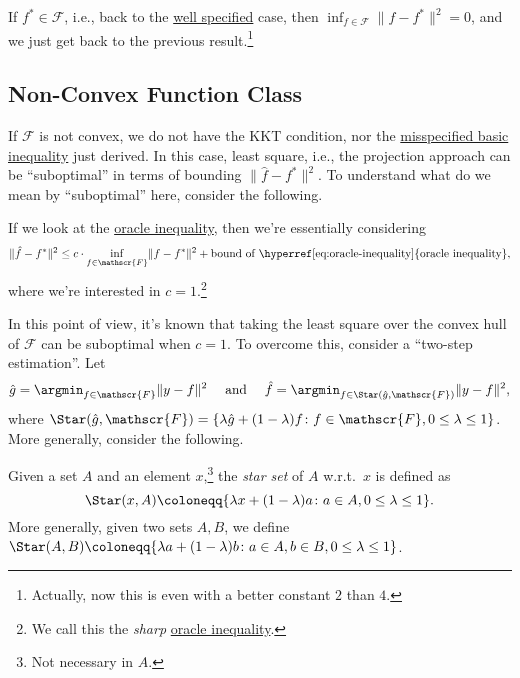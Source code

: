 \begin{remark}
	If \(f^{\ast} \in \mathscr{F} \), i.e., back to the \hyperref[def:well-specified]{well specified} case, then \(\inf _{f\in \mathscr{F} } \lVert f - f^{\ast} \rVert ^2 = 0\), and we just get back to the previous result.\footnote{Actually, now this is even with a better constant \(2\) than \(4\).}
\end{remark}

\subsection{Non-Convex Function Class}
If \(\mathscr{F} \) is not convex, we do not have the KKT condition, nor the \hyperref[eq:misspecified-convex-basic-inequality]{misspecified basic inequality} just derived. In this case, least square, i.e., the projection approach can be ``suboptimal'' in terms of bounding \(\lVert \hat{f} - f^{\ast} \rVert ^2\). To understand what do we mean by ``suboptimal'' here, consider the following.

\begin{intuition}
	If we look at the \hyperref[eq:oracle-inequality]{oracle inequality}, then we're essentially considering
	\[
		\lVert \hat{f} - f^{\ast}  \rVert ^2 \leq c \cdot \inf _{f\in \mathscr{F} } \lVert f - f^{\ast}  \rVert ^2 + \text{bound of \hyperref[eq:oracle-inequality]{oracle inequality}},
	\]
	where we're interested in \(c = 1\).\footnote{We call this the \emph{sharp} \hyperref[eq:oracle-inequality]{oracle inequality}.}
\end{intuition}

In this point of view, it's known that taking the least square over the convex hull of \(\mathscr{F} \) can be suboptimal when \(c = 1\). To overcome this, consider a ``two-step estimation''. Let
\[
	\hat{g} = \argmin_{f\in \mathscr{F} } \lVert y - f \rVert ^2
	\quad\text{ and }\quad
	\hat{f} = \argmin_{f\in \Star(\hat{g} , \mathscr{F} ) } \lVert y - f \rVert ^2,
\]
where \(\Star(\hat{g} , \mathscr{F} ) = \{ \lambda \hat{g} + (1 - \lambda ) f \colon f\in \mathscr{F} , 0 \leq \lambda \leq 1 \} \). More generally, consider the following.

\begin{definition}\label{def:star-set}
	Given a set \(A\) and an element \(x\),\footnote{Not necessary in \(A\).} the \emph{star set} of \(A\) w.r.t.\ \(x\) is defined as
	\[
		\Star(x, A) \coloneqq \{ \lambda x + (1 - \lambda ) a \colon a\in A , 0 \leq \lambda \leq 1 \}.
	\]
	More generally, given two sets \(A, B\), we define \(\Star(A, B) \coloneqq \{ \lambda a + (1 - \lambda ) b \colon a\in A , b\in B, 0 \leq \lambda \leq 1 \}\).
\end{definition}

